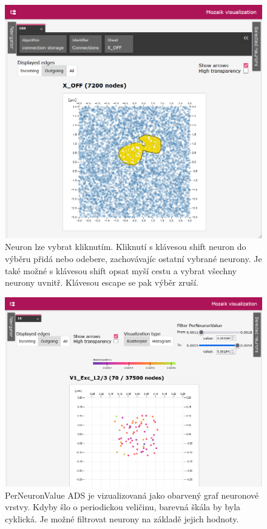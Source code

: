 \begin{figure}
	\centering
	\includegraphics[width=1\linewidth]{img/screenshot_lasso.png}
	\caption{Neuron lze vybrat kliknutím. Kliknutí s klávesou shift neuron do výběru přidá nebo odebere, zachovávajíc ostatní vybrané neurony. Je také možné s klávesou shift opsat myší cestu a vybrat všechny neurony uvnitř. Klávesou escape se pak výběr zruší.}
	\label{fig:lasso}
\end{figure}

\begin{figure}
	\centering
	\includegraphics[width=1\linewidth]{img/screenshot_pnv.png}
	\caption{PerNeuronValue ADS je vizualizovaná jako obarvený graf neuronové vrstvy. Kdyby šlo o periodickou veličinu, barevná škála by byla cyklická. Je možné filtrovat neurony na základě jejich hodnoty.}
	\label{fig:pnv}
\end{figure}


